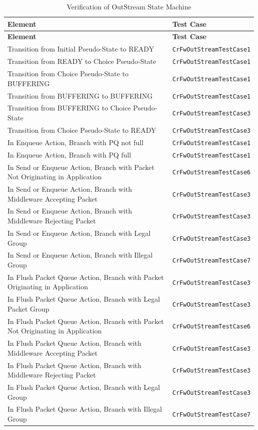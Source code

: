 \documentclass[a4paper,10pt]{article}
\begin{document}
\begin{longtable}{|>{\raggedright}p{6.0cm}|P{5.0cm}|}
\caption{Verification of OutStream State Machine}
\label{tab:verOutStreamSM}\\
\hline
{}
\textbf{Element} & \textbf{Test Case} \\
\hline
\endfirsthead
{}
\textbf{Element} & \textbf{Test Case} \\
\hline
\endhead
Transition from Initial Pseudo-State to READY  & \texttt{CrFwOutStreamTestCase1}\\
\hline
Transition from READY to Choice Pseudo-State & \texttt{CrFwOutStreamTestCase1}\\
\hline
Transition from Choice Pseudo-State to BUFFERING & \texttt{CrFwOutStreamTestCase1}\\
\hline
Transition from BUFFERING to BUFFERING & \texttt{CrFwOutStreamTestCase1}\\
\hline
Transition from BUFFERING to Choice Pseudo-State & \texttt{CrFwOutStreamTestCase3}\\
\hline
Transition from Choice Pseudo-State to READY & \texttt{CrFwOutStreamTestCase3}\\
\hline
In Enqueue Action, Branch with PQ not full & \texttt{CrFwOutStreamTestCase1}\\
\hline
In Enqueue Action, Branch with PQ full & \texttt{CrFwOutStreamTestCase1}\\
\hline
In Send or Enqueue Action, Branch with Packet Not Originating in Application & \texttt{CrFwOutStreamTestCase6}\\
\hline
In Send or Enqueue Action, Branch with Middleware Accepting Packet & \texttt{CrFwOutStreamTestCase3}\\
\hline
In Send or Enqueue Action, Branch with Middleware Rejecting Packet & \texttt{CrFwOutStreamTestCase3}\\
\hline
In Send or Enqueue Action, Branch with Legal Group & \texttt{CrFwOutStreamTestCase3}\\
\hline
In Send or Enqueue Action, Branch with Illegal Group & \texttt{CrFwOutStreamTestCase7}\\
\hline
In Flush Packet Queue Action, Branch with Packet Originating in Application & \texttt{CrFwOutStreamTestCase3}\\
\hline
In Flush Packet Queue Action, Branch with Legal Packet Group & \texttt{CrFwOutStreamTestCase3}\\
\hline
In Flush Packet Queue Action, Branch with Packet Not Originating in Application & \texttt{CrFwOutStreamTestCase6}\\
\hline
In Flush Packet Queue Action, Branch with Middleware Accepting Packet & \texttt{CrFwOutStreamTestCase3}\\
\hline
In Flush Packet Queue Action, Branch with Middleware Rejecting Packet & \texttt{CrFwOutStreamTestCase3}\\
\hline
In Flush Packet Queue Action, Branch with Legal Group & \texttt{CrFwOutStreamTestCase3}\\
\hline
In Flush Packet Queue Action, Branch with Illegal Group & \texttt{CrFwOutStreamTestCase7}\\
\hline
\end{longtable}
\end{document}

